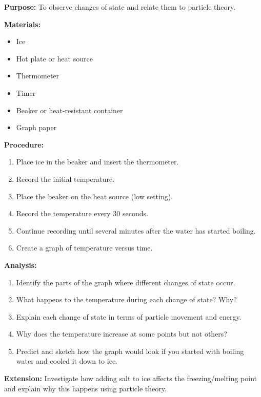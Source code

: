\documentclass[justified,notoc]{tufte-book}
\newenvironment{investigation}[1]{%
    \begin{tcolorbox}[colback=info!10,colframe=info,title=\textbf{Investigation: #1}]
}{%
    \end{tcolorbox}
}
\begin{document}
\begin{investigation}{Investigating Changes of State}
\textbf{Purpose:} To observe changes of state and relate them to particle theory.

\textbf{Materials:}
\begin{itemize}
    \item Ice
    \item Hot plate or heat source
    \item Thermometer
    \item Timer
    \item Beaker or heat-resistant container
    \item Graph paper
\end{itemize}

\textbf{Procedure:}
\begin{enumerate}
    \item Place ice in the beaker and insert the thermometer.
    \item Record the initial temperature.
    \item Place the beaker on the heat source (low setting).
    \item Record the temperature every 30 seconds.
    \item Continue recording until several minutes after the water has started boiling.
    \item Create a graph of temperature versus time.
\end{enumerate}

\textbf{Analysis:}
\begin{enumerate}
    \item Identify the parts of the graph where different changes of state occur.
    \item What happens to the temperature during each change of state? Why?
    \item Explain each change of state in terms of particle movement and energy.
    \item Why does the temperature increase at some points but not others?
    \item Predict and sketch how the graph would look if you started with boiling water and cooled it down to ice.
\end{enumerate}

\textbf{Extension:} Investigate how adding salt to ice affects the freezing/melting point and explain why this happens using particle theory.
\end{investigation}
\end{document}
